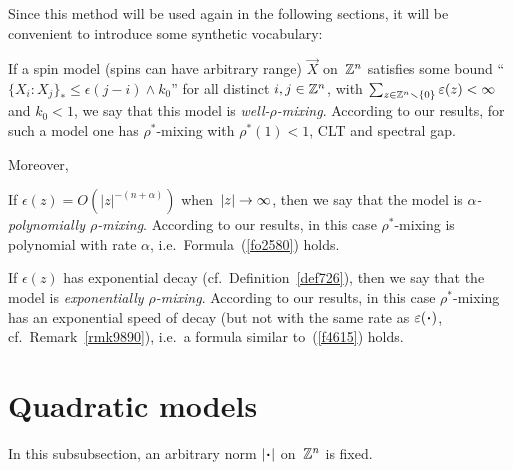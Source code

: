 Since this method will be used again in the following sections,
it will be convenient to introduce some synthetic vocabulary:
%
\begin{Def}\label{def-WRM}
If a spin model (spins can have arbitrary range) $\vec{X}$ on~$\mathbb{Z}^n$ satisfies some bound
``${\{X_i:X_j\}_*} \leq \epsilon(j-i) \wedge k_0$'' for all distinct $i,j \in \mathbb{Z}^n$,
with $\sum_{z\in\mathbb{Z}^n\smallsetminus\{0\}} \varepsilon(z) < \infty$ and $k_0 < 1$,
we say that this model is \emph{well-$\rho$-mixing}.
According to our results, for such a model one has $\rho^*$-mixing with $\rho^*(1)<1$,
CLT and spectral gap.

Moreover,
\begin{ienumerate}
\item If $\epsilon(z) = O(|z|^{-(n+\alpha)})$ when~$|z|\to\infty$,
then we say that the model is \emph{$\alpha$-polynomially $\rho$-mixing}.
According to our results, in this case $\rho^*$-mixing is polynomial with rate $\alpha$,
i.e.\ Formula~(\ref{fo2580}) holds.
\item If $\epsilon(z)$ has exponential decay (cf.\ Definition~\ref{def726}),
then we say that the model is \emph{exponentially $\rho$-mixing}.
According to our results, in this case $\rho^*$-mixing has an exponential speed of decay
(but not with the same rate as $\epsilon(\Bcdot)$, cf.\ Remark~\ref{rmk9890}),
i.e.\ a formula similar to~(\ref{f4615}) holds.
\end{ienumerate}
\end{Def}


\section{Quadratic models}\label{parQuadraticModels}

\begin{NOTA}
In this subsubsection, an arbitrary norm $|\Bcdot|$ on~$\mathbb{Z}^n$ is fixed.
\end{NOTA}

